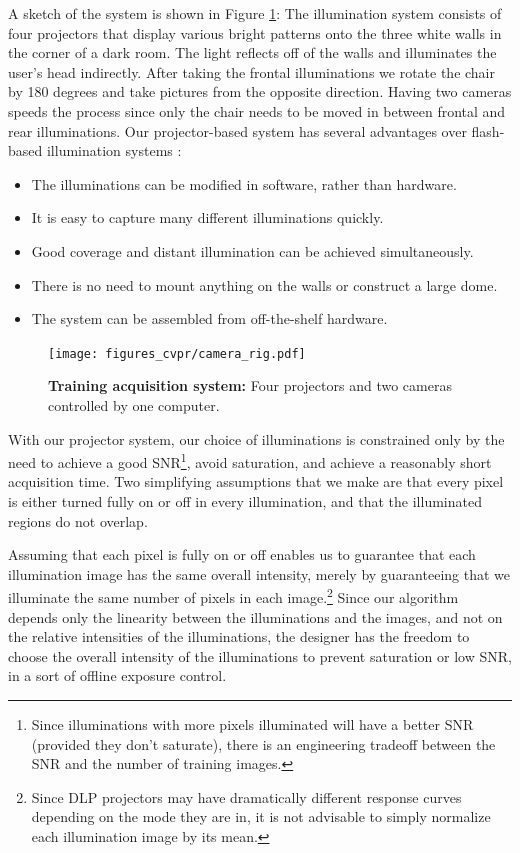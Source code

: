 \documentclass[12pt,journal,draftcls,letterpaper,onecolumn]{IEEEtran}
\providecommand{\DIFadd}[1]{{\protect\color{blue}\uwave{#1}}} %
\providecommand{\DIFaddbegin}{} %
\providecommand{\DIFaddend}{} %
\begin{document}
\DIFaddend A sketch of the
system is shown in Figure \ref{fig:system}: The illumination
system consists of four projectors that display various bright
patterns onto the three white walls in the corner of a dark
room.  The light reflects off of the walls and illuminates the
user's head indirectly.  After taking the frontal illuminations
we rotate the chair by 180 degrees and take pictures from the
opposite direction.  Having two cameras speeds the process
since only the chair needs to be moved in between frontal and
rear illuminations. Our projector-based system has several
advantages over flash-based illumination systems \DIFaddbegin \DIFadd{for face recognition}\DIFaddend :
\begin{itemize}
\item The illuminations can be modified in software, rather than hardware.
\item It is easy to capture many different illuminations quickly.
\item Good coverage and distant illumination can be achieved simultaneously.
\item There is no need to mount anything on the walls or construct a large dome.
\item The system can be assembled from off-the-shelf hardware.
\end{itemize}
\begin{figure}
\centerline{\hspace{-0.1in}\texttt{[image: figures\_cvpr/camera\_rig.pdf]}}
\caption{{\bf Training acquisition system:} Four projectors and two cameras controlled by one computer.}
\vspace{-.5in}
\label{fig:system}
\end{figure}
With our projector system, our choice of illuminations is
constrained only by the need to achieve a good
SNR\footnote{Since illuminations with more pixels illuminated
will have a better SNR (provided they don't saturate), there is
an engineering tradeoff between the SNR and the number of
training images.}, avoid saturation, and achieve
a reasonably short acquisition time.  Two simplifying
assumptions that we make are that every pixel is either turned
fully on or off in every illumination, and that the illuminated
regions do not overlap.

Assuming that each pixel is fully on or off enables us to guarantee
that each illumination image has the same overall intensity, merely
by guaranteeing that we illuminate the same number of pixels in each image.\footnote{Since DLP projectors may have dramatically different response
curves depending on the mode they are in, it is not advisable to simply normalize each illumination image by its mean.}
Since our algorithm depends only \DIFaddbegin \DIFadd{on  }\DIFaddend the
linearity between the illuminations and the images, and not on the
relative intensities of the illuminations, the designer has the freedom to choose the overall intensity of the illuminations
to prevent saturation or low SNR, in a sort of offline exposure control.
\end{document}
